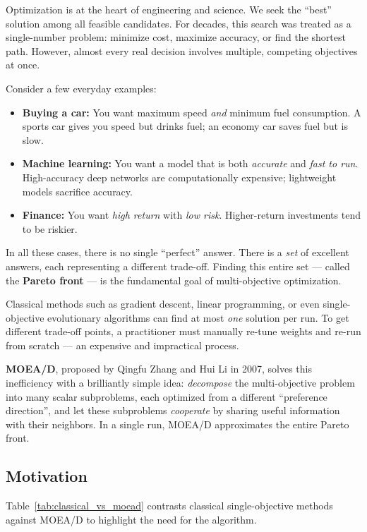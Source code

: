 \documentclass[12pt,a4paper]{article}
\begin{document}
Optimization is at the heart of engineering and science. We seek the ``best'' solution among all feasible candidates. For decades, this search was treated as a single-number problem: minimize cost, maximize accuracy, or find the shortest path. However, almost every real decision involves multiple, competing objectives at once.

Consider a few everyday examples:
\begin{itemize}[leftmargin=1.5cm]
    \item \textbf{Buying a car:} You want maximum speed \emph{and} minimum fuel consumption. A sports car gives you speed but drinks fuel; an economy car saves fuel but is slow.
    \item \textbf{Machine learning:} You want a model that is both \emph{accurate} and \emph{fast to run}. High-accuracy deep networks are computationally expensive; lightweight models sacrifice accuracy.
    \item \textbf{Finance:} You want \emph{high return} with \emph{low risk}. Higher-return investments tend to be riskier.
\end{itemize}

In all these cases, there is no single ``perfect'' answer. There is a \emph{set} of excellent answers, each representing a different trade-off. Finding this entire set --- called the \textbf{Pareto front} --- is the fundamental goal of multi-objective optimization.

Classical methods such as gradient descent, linear programming, or even single-objective evolutionary algorithms can find at most \emph{one} solution per run. To get different trade-off points, a practitioner must manually re-tune weights and re-run from scratch --- an expensive and impractical process.

\textbf{MOEA/D}, proposed by Qingfu Zhang and Hui Li in 2007, solves this inefficiency with a brilliantly simple idea: \emph{decompose} the multi-objective problem into many scalar subproblems, each optimized from a different ``preference direction'', and let these subproblems \emph{cooperate} by sharing useful information with their neighbors. In a single run, MOEA/D approximates the entire Pareto front.

\subsection{Motivation}

Table~\ref{tab:classical_vs_moead} contrasts classical single-objective methods against MOEA/D to highlight the need for the algorithm.
\end{document}
